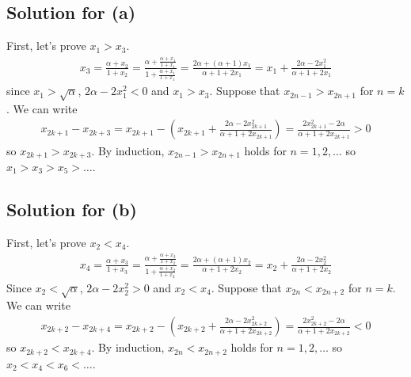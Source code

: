 \documentclass{scrartcl}
\begin{document}
\subsection{Solution for (a)}
First, let's prove \(x_1 > x_3\).
\begin{align*}
  x_3 = \frac{\alpha + x_2}{1 + x_2} = \frac{\alpha + \frac{\alpha + x_1}{1 + x_1}}{1 + \frac{\alpha + x_1}{1 + x_1}} = \frac{2\alpha + (\alpha + 1)x_1}{\alpha + 1 + 2x_1} = x_1 + \frac{2\alpha - 2x_1^2}{\alpha + 1 + 2x_1}
\end{align*}
since \(x_1 > \sqrt\alpha\), \(2\alpha - 2x_1^2 < 0\) and \(x_1 > x_3\).
Suppose that \(x_{2n - 1} > x_{2n + 1}\) for \(n = k\).
We can write
\begin{align*}
  x_{2k + 1} - x_{2k + 3} = x_{2k + 1} - \left( x_{2k + 1} + \frac{2\alpha - 2x_{2k + 1}^2}{\alpha + 1 + 2x_{2k + 1}} \right) = \frac{2x_{2k + 1}^2 - 2\alpha}{\alpha + 1 + 2x_{2k + 1}} > 0
\end{align*}
so \(x_{2k + 1} > x_{2k + 3}\).
By induction, \(x_{2n - 1} > x_{2n + 1}\) holds for \(n = 1, 2, \dots\) so \(x_1 > x_3 > x_5 > \dots\).

\subsection{Solution for (b)}
First, let's prove \(x_2 < x_4\).
\begin{align*}
  x_4 = \frac{\alpha + x_3}{1 + x_3} = \frac{\alpha + \frac{\alpha + x_2}{1 + x_2}}{1 + \frac{\alpha + x_2}{1 + x_2}} = \frac{2\alpha + (\alpha + 1)x_2}{\alpha + 1 + 2x_2} = x_2 + \frac{2\alpha - 2x_2^2}{\alpha + 1 + 2x_2}
\end{align*}
Since \(x_2 < \sqrt\alpha\), \(2\alpha - 2x_2^2 > 0\) and \(x_2 < x_4\).
Suppose that \(x_{2n} < x_{2n + 2}\) for \(n = k\).
We can write
\begin{align*}
  x_{2k + 2} - x_{2k + 4} = x_{2k + 2} - \left( x_{2k + 2} + \frac{2\alpha - 2x_{2k + 2}^2}{\alpha + 1 + 2x_{2k + 2}} \right) = \frac{2x_{2k + 2}^2 - 2\alpha}{\alpha + 1 + 2x_{2k + 2}} < 0
\end{align*}
so \(x_{2k + 2} < x_{2k + 4}\).
By induction, \(x_{2n} < x_{2n + 2}\) holds for \(n = 1, 2, \dots\) so \(x_2 < x_4 < x_6 < \dots\).
\end{document}
